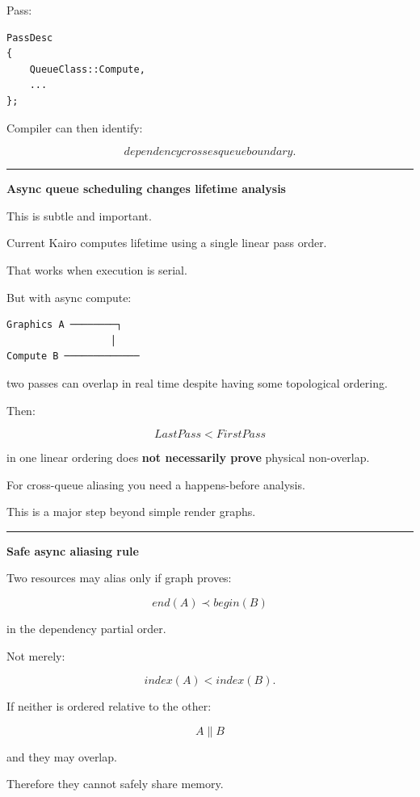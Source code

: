Pass:

\begin{verbatim}
PassDesc
{
    QueueClass::Compute,
    ...
};
\end{verbatim}

Compiler can then identify:

\[
\boxed{
dependency crosses queue boundary.
}
\]

\begin{center}\rule{0.5\linewidth}{0.5pt}\end{center}

\textbf{Async queue scheduling changes lifetime analysis}

This is subtle and important.

Current Kairo computes lifetime using a single linear pass order.

That works when execution is serial.

But with async compute:

\begin{verbatim}
Graphics A ────────┐
                  │
Compute B ─────────────
\end{verbatim}

two passes can overlap in real time despite having some topological ordering.

Then:

\[
LastPass<FirstPass
\]

in one linear ordering does \textbf{not necessarily prove} physical non-overlap.

For cross-queue aliasing you need a happens-before analysis.

This is a major step beyond simple render graphs.

\begin{center}\rule{0.5\linewidth}{0.5pt}\end{center}

\textbf{Safe async aliasing rule}

Two resources may alias only if graph proves:

\[
end(A)
\prec
begin(B)
\]

in the dependency partial order.

Not merely:

\[
index(A)<index(B).
\]

If neither is ordered relative to the other:

\[
A\parallel B
\]

and they may overlap.

Therefore they cannot safely share memory.

